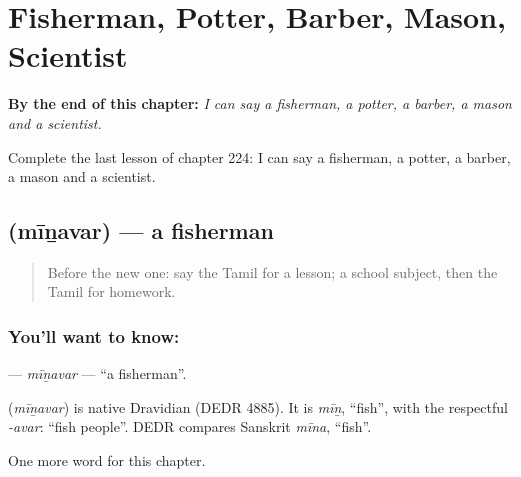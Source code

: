 
\chapter{Fisherman, Potter, Barber, Mason, Scientist}
\label{ch:ta-fisherman-potter-barber-mason-scientist}

\begin{chapteropening}
\textbf{By the end of this chapter:} \emph{I can say a fisherman, a potter, a barber, a mason and a scientist.}

Complete the last lesson of chapter 224: I can say a fisherman, a potter, a barber, a mason and a scientist.
\end{chapteropening}

\section[\texorpdfstring{\ta{மீனவர்} (mīṉavar)}{மீனவர் (mīṉavar)}]{ (mīṉavar) — a fisherman}

\label{lesson:TA-C224-minavar}



\begin{quote}
Before the new one: say the Tamil for a lesson; a school subject, then the Tamil for homework.
\end{quote}

\subsection*{You'll want to know: }
\textbf{} — \emph{mīṉavar} — \textquotedblleft{}a fisherman\textquotedblright{}.

\begin{cousinweb}
\textbf{} (\emph{mīṉavar}) is native Dravidian (DEDR 4885). It is \emph{mīṉ}, \textquotedblleft{}fish\textquotedblright{}, with the respectful \emph{-avar}: \textquotedblleft{}fish people\textquotedblright{}. DEDR compares Sanskrit \emph{mīna}, \textquotedblleft{}fish\textquotedblright{}.
\end{cousinweb}

\begin{grammarlens}[title={What you've built}]
One more word for this chapter.
\end{grammarlens}

